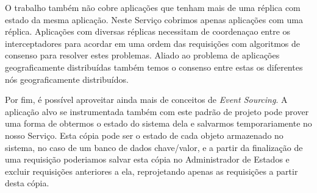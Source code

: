 O trabalho também não cobre aplicações que tenham mais de uma réplica com estado da
mesma aplicação. Neste Serviço cobrimos apenas aplicações com uma réplica.
Aplicações com diversas réplicas necessitam de coordenaçao entre os interceptadores
para acordar em uma ordem das requisições com algoritmos de consenso para resolver
estes problemas. Aliado ao problema de aplicações geograficamente distribuídas
também temos o consenso entre estas os diferentes nós geograficamente distribuídos.

Por fim, é possível aproveitar ainda mais de conceitos de \textit{Event Sourcing}.
A aplicação alvo se instrumentada também com este padrão de projeto pode prover uma
forma de obtermos o estado do sistema dela e salvarmos temporariamente no nosso
Serviço. Esta cópia pode ser o estado de cada objeto armazenado no sistema, no caso
de um banco de dados chave/valor, e a partir da finalização de uma requisição poderiamos
salvar esta cópia no Administrador de Estados e excluir requisições anteriores a ela,
reprojetando apenas as requisições a partir desta cópia.
